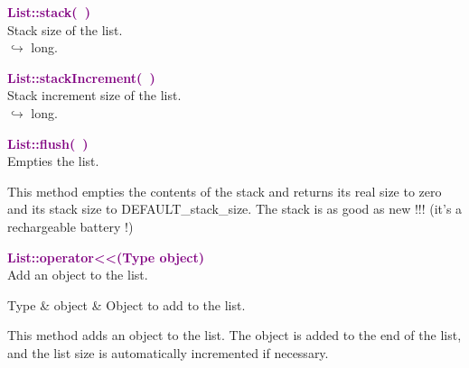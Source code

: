 
\textcolor{purple}{\textbf{List::stack(~)}}\label{List::stack()}\\
Stack size of the list.\\ \hspace*{10mm}$\hookrightarrow$ long.


\textcolor{purple}{\textbf{List::stackIncrement(~)}}\label{List::stackIncrement()}\\
Stack increment size of the list.\\ \hspace*{10mm}$\hookrightarrow$ long.


\textcolor{purple}{\textbf{List::flush(~)}}\label{List::flush()}\\
Empties the list.

This method empties the contents of the stack and returns its real size to zero and its stack size to DEFAULT\_stack\_size.
The stack is as good as new !!! (it's a rechargeable battery !)

\textcolor{purple}{\textbf{List::operator<<(Type object)}}\label{List::operator<<(Type object)}\\
Add an object to the list.

\begin{tcolorbox}[width=\textwidth,myArgs,tabularx={ll|R}]
Type & object & Object to add to the list.
\end{tcolorbox}

This method adds an object to the list. The object is added to the end of the list, and the list size is automatically incremented if necessary.

